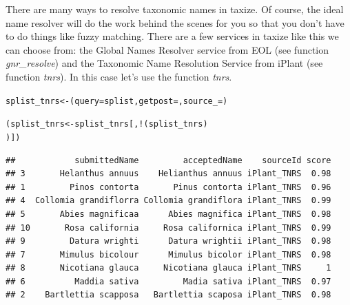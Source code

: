 There are many ways to resolve taxonomic names in taxize. Of course, the ideal name resolver will do the work behind the scenes for you so that you don't have to do things like fuzzy matching. There are a few services in taxize like this we can choose from: the Global Names Resolver service from EOL (see function \emph{gnr\_resolve}) and the Taxonomic Name Resolution Service from iPlant (see function \emph{tnrs}). In this case let's use the function \emph{tnrs}. 

\begin{knitrout}
\color{fgcolor}\begin{kframe}
\begin{alltt}
splist_tnrs <- (query = splist, getpost = , source_ = )
\end{alltt}


{\ttfamily\noindent\itshape\color{messagecolor}{\#\# Calling http://taxosaurus.org/retrieve/bfbc273486fa308454b9f3afaabdb3e3}}\begin{alltt}

(splist_tnrs <- splist_tnrs[, !(splist_tnrs) %
    )])
\end{alltt}
\begin{verbatim}
##            submittedName         acceptedName    sourceId score
## 3       Helanthus annuus    Helianthus annuus iPlant_TNRS  0.98
## 1         Pinos contorta       Pinus contorta iPlant_TNRS  0.96
## 4  Collomia grandiflorra Collomia grandiflora iPlant_TNRS  0.99
## 5       Abies magnificaa      Abies magnifica iPlant_TNRS  0.98
## 10       Rosa california     Rosa californica iPlant_TNRS  0.99
## 9         Datura wrighti      Datura wrightii iPlant_TNRS  0.98
## 7       Mimulus bicolour      Mimulus bicolor iPlant_TNRS  0.98
## 8       Nicotiana glauca     Nicotiana glauca iPlant_TNRS     1
## 6          Maddia sativa         Madia sativa iPlant_TNRS  0.97
## 2    Bartlettia scapposa   Bartlettia scaposa iPlant_TNRS  0.98
\end{verbatim}
\begin{alltt}



\end{alltt}
\end{kframe}
\end{knitrout}
